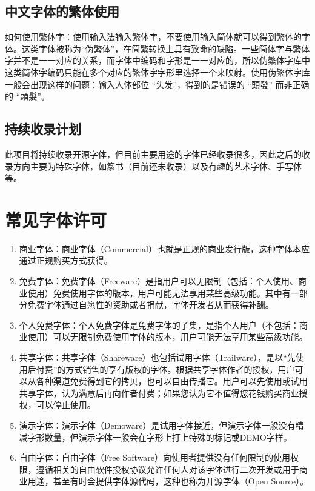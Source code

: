 \documentclass{../../PublicResources/DocClass}
\begin{document}
\section{中文字体的繁体使用}
如何使用繁体字：使用输入法输入繁体字，不要使用输入简体就可以得到繁体的字体。这类字体被称为“伪繁体”，在简繁转换上具有致命的缺陷。一些简体字与繁体字并不是一一对应的关系，而字体中编码和字形是一一对应的，所以伪繁体字库中这类简体字编码只能在多个对应的繁体字字形里选择一个来映射。使用伪繁体字库一般会出现这样的问题：输入人体部位 “头发”，得到的是错误的 “頭發” 而非正确的 “頭髮”。

\section{持续收录计划}
此项目将持续收录开源字体，但目前主要用途的字体已经收录很多，因此之后的收录方向主要为特殊字体，如篆书（目前还未收录）以及有趣的艺术字体、手写体等。

\appendix
\chapter{常见字体许可}
\begin{enumerate}
    \item 商业字体：商业字体（Commercial）也就是正规的商业发行版，这种字体本应通过正规购买方式获得。

    \item 免费字体：免费字体（Freeware）是指用户可以无限制（包括：个人使用、商业使用）免费使用字体的版本，用户可能无法享用某些高级功能。其中有一部分免费字体通过自愿性的资助或者捐献，字体开发者从而获得补酬。

    \item 个人免费字体：个人免费字体是免费字体的子集，是指个人用户（不包括：商业使用）可以无限制免费使用字体的版本，用户可能无法享用某些高级功能。

    \item 共享字体：共享字体（Shareware）也包括试用字体（Trailware），是以“先使用后付费”的方式销售的享有版权的字体。根据共享字体作者的授权，用户可以从各种渠道免费得到它的拷贝，也可以自由传播它。用户可以先使用或试用共享字体，认为满意后再向作者付费；如果您认为它不值得您花钱购买商业授权，可以停止使用。

    \item 演示字体：演示字体（Demoware）是试用字体接近，但演示字体一般没有精减字形数量，但演示字体一般会在字形上打上特殊的标记或DEMO字样。

    \item 自由字体：自由字体（Free Software）向使用者提供没有任何限制的使用权限，遵循相关的自由软件授权协议允许任何人对该字体进行二次开发或用于商业用途，甚至有时会提供字体源代码，这种也称为开源字体（Open Source）。

\end{enumerate}
\end{document}
